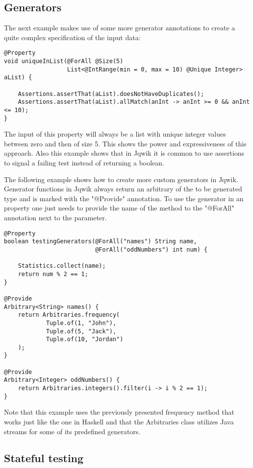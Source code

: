 \documentclass[a4paper, 12pt]{article} %
\begin{document}
\subsection{Generators}

The next example makes use of some more generator annotations to create a quite complex specification of the input data: \cite{jqwikdoc}

\begin{verbatim}
@Property
void uniqueInList(@ForAll @Size(5) 
                  List<@IntRange(min = 0, max = 10) @Unique Integer> aList) {
    
    Assertions.assertThat(aList).doesNotHaveDuplicates();
    Assertions.assertThat(aList).allMatch(anInt -> anInt >= 0 && anInt <= 10);
}
\end{verbatim}

The input of this property will always be a list with unique integer values between zero and then of size 5. This shows the power and expressiveness of this approach. Also this example shows that in Jqwik it is common to use assertions to signal a failing test instead of returning a boolean.

The following example shows how to create more custom generators in Jqwik. Generator functions in Jqwik always return an arbitrary of the to be generated type and is marked with the "@Provide" annotation. To use the generator in an property one just needs to provide the name of the method to the "@ForAll" annotation next to the parameter.

\begin{verbatim}
@Property
boolean testingGenerators(@ForAll("names") String name, 
                          @ForAll("oddNumbers") int num) {

    Statistics.collect(name);
    return num % 2 == 1;
}

@Provide
Arbitrary<String> names() {
    return Arbitraries.frequency(
            Tuple.of(1, "John"),
            Tuple.of(5, "Jack"),
            Tuple.of(10, "Jordan")
    );
}

@Provide
Arbitrary<Integer> oddNumbers() {
    return Arbitraries.integers().filter(i -> i % 2 == 1);
}
\end{verbatim} 

Note that this example uses the previously presented frequency method that works just like the one in Haskell and that the Arbitraries class utilizes Java streams for some of its predefined generators.

\subsection{Stateful testing}
\end{document}
